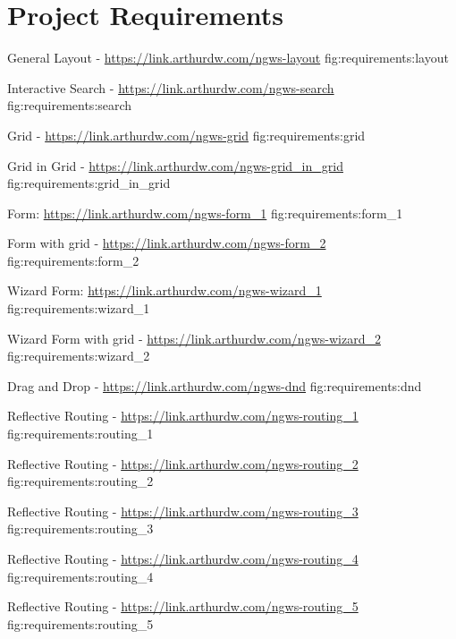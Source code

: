 \chapter{Project Requirements}

{General Layout - \url{https://link.arthurdw.com/ngws-layout}}
{fig:requirements:layout}

{Interactive Search - \url{https://link.arthurdw.com/ngws-search}}
{fig:requirements:search}

{Grid - \url{https://link.arthurdw.com/ngws-grid}}
{fig:requirements:grid}

{Grid in Grid - \url{https://link.arthurdw.com/ngws-grid_in_grid}}
{fig:requirements:grid_in_grid}

{Form: \url{https://link.arthurdw.com/ngws-form_1}}
{fig:requirements:form_1}

{Form with grid - \url{https://link.arthurdw.com/ngws-form_2}}
{fig:requirements:form_2}

{Wizard Form: \url{https://link.arthurdw.com/ngws-wizard_1}}
{fig:requirements:wizard_1}

{Wizard Form with grid - \url{https://link.arthurdw.com/ngws-wizard_2}}
{fig:requirements:wizard_2}

{Drag and Drop - \url{https://link.arthurdw.com/ngws-dnd}}
{fig:requirements:dnd}

{Reflective Routing - \url{https://link.arthurdw.com/ngws-routing_1}}
{fig:requirements:routing_1}

{Reflective Routing - \url{https://link.arthurdw.com/ngws-routing_2}}
{fig:requirements:routing_2}

{Reflective Routing - \url{https://link.arthurdw.com/ngws-routing_3}}
{fig:requirements:routing_3}

{Reflective Routing - \url{https://link.arthurdw.com/ngws-routing_4}}
{fig:requirements:routing_4}

{Reflective Routing - \url{https://link.arthurdw.com/ngws-routing_5}}
{fig:requirements:routing_5}

